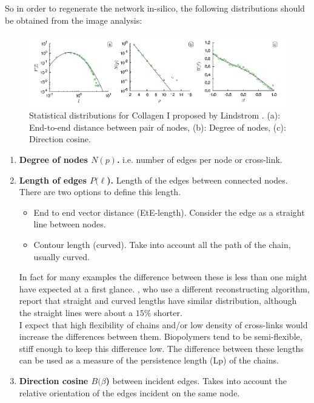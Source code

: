So in order to regenerate the network in-silico, the following distributions
should be obtained from the image analysis:
\begin{figure}[h!]
\begin{center}
\includegraphics[width=1.0\textwidth]{Figures/chapter-reconstruct/lindstrom-paper-images.png}

\caption[Collagen distributions]{Statistical distributions for Collagen I proposed by Lindstrom
\citep{lindstrom_biopolymer_2010}. (a): End-to-end distance between pair of nodes, (b): Degree of nodes, (c): Direction cosine.}

\end{center}
\end{figure}

\begin{enumerate}
\item \textbf{Degree of nodes $N(p)$.} i.e. number of edges per node
or cross-link.
\item \textbf{Length of edges $P(\ell$).} Length of the edges
between connected nodes.
There are two options to define this length.
\begin{itemize}
\item End to end vector distance (EtE-length). Consider the edge as a straight
line between nodes.

\item Contour length (curved). Take into account all the path of the chain,
usually curved.
\end{itemize}

In fact for many examples the difference between these is less than one
might have expected at a first glance. \citet{nisslert_identification_2007},
who use a different reconstructing algorithm, report that straight and curved
lengths have similar distribution, although the straight lines were about a
$15\%$ shorter.\\
I expect that high flexibility of chains and/or low density of cross-links
would increase the differences between them. Biopolymers tend to be semi-flexible, stiff
enough to keep this difference low.
The difference between these lengths can be used as a measure of the
persistence length (\gls{Lp}) of the chains.


\item \textbf{Direction cosine $B(\beta$)} between incident edges. Takes into
account the relative orientation of the edges incident on the same node.


\end{enumerate}

